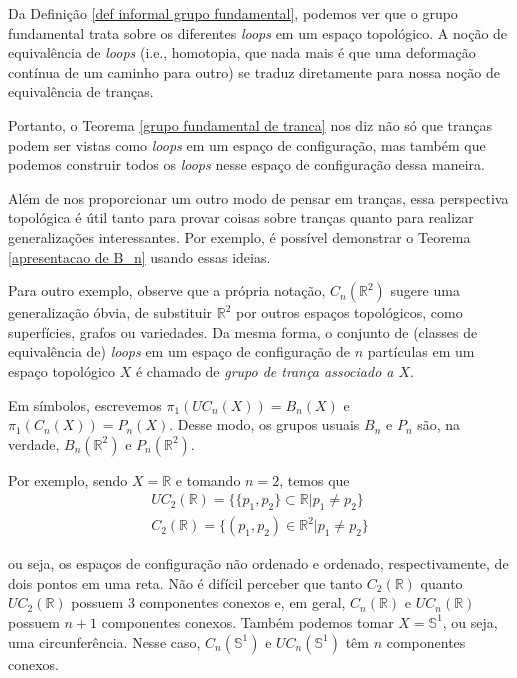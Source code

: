 	\par\vspace{0.3cm} Da Definição \eqref{def informal grupo fundamental}, podemos ver que o grupo fundamental trata sobre os diferentes \textit{loops} em um espaço topológico. A noção de equivalência de \textit{loops} (i.e., homotopia, que nada mais é que uma deformação contínua de um caminho para outro) se traduz diretamente para nossa noção de equivalência de tranças.
	\par\vspace{0.3cm} Portanto, o Teorema \eqref{grupo fundamental de tranca} nos diz não só que tranças podem ser vistas como \textit{loops} em um espaço de configuração, mas também que podemos construir todos os \textit{loops} nesse espaço de configuração dessa maneira.
	\par\vspace{0.3cm} Além de nos proporcionar um outro modo de pensar em tranças, essa perspectiva topológica é útil tanto para provar coisas sobre tranças quanto para realizar generalizações interessantes. Por exemplo, é possível demonstrar o Teorema \eqref{apresentacao de B_n} usando essas ideias. 
	\par\vspace{0.3cm} Para outro exemplo, observe que a própria notação, $C_n(\mathbb{R}^2)$ sugere uma generalização óbvia, de substituir $\mathbb{R}^2$ por outros espaços topológicos, como superfícies, grafos ou variedades. Da mesma forma, o conjunto de (classes de equivalência de) \textit{loops} em um espaço de configuração de $n$ partículas em um espaço topológico $X$ é chamado de \textit{grupo de trança associado a $X$}.
	\par\vspace{0.3cm} Em símbolos, escrevemos $\pi_1(UC_n(X)) = B_n(X)$ e $\pi_1(C_n(X)) = P_n(X)$. Desse modo, os grupos usuais $B_n$ e $P_n$ são, na verdade, $B_n(\mathbb{R}^2)$ e $P_n(\mathbb{R}^2)$.
	\par\vspace{0.3cm} Por exemplo, sendo $X = \mathbb{R}$ e tomando $n=2$, temos que
	\begin{align*}
	UC_2(\mathbb{R}) = \big\{  \{p_1,p_2\}\subset\mathbb{R}|p_1\neq p_2  \big\} \\
	C_2(\mathbb{R}) = \big\{ (p_1,p_2)\in\mathbb{R}^2|p_1\neq p_2 \big\}
	\end{align*}
	\par\vspace{0.3cm} ou seja, os espaços de configuração não ordenado e ordenado, respectivamente, de dois pontos em uma reta. Não é difícil perceber que tanto $C_2(\mathbb{R})$ quanto $UC_2(\mathbb{R})$ possuem 3 componentes conexos e, em geral, $C_n(\mathbb{R})$ e $UC_n(\mathbb{R})$ possuem $n+1$ componentes conexos. Também podemos tomar $X = \mathbb{S}^1$, ou seja, uma circunferência. Nesse caso, $C_n(\mathbb{S}^1)$ e $UC_n(\mathbb{S}^1)$ têm $n$ componentes conexos.

